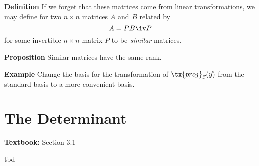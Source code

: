 \documentclass[letterpaper, 10pt]{article}
\begin{document}
\vspace{200pt}
\lb
\textbf{Definition}
\lb
If we forget that these matrices come from linear transformations, we may define for
two $n \times n$ matrices $A$ and $B$ related by
\[ A = P B \iv P \]
for some invertible $n \times n$ matrix $P$ to be \emph{similar} matrices.



\lb
\textbf{Proposition}
\lb
Similar matrices have the same rank.






\newpage
\lb
\textbf{Example}
\lb
Change the basis for the transformation of $\tx{proj}_{\vec x}(\vec y)$ from the standard basis
to a more convenient basis.
















\newpage
\section*{The Determinant}%
\textbf{Textbook:} Section 3.1
\lb



tbd
\end{document}
